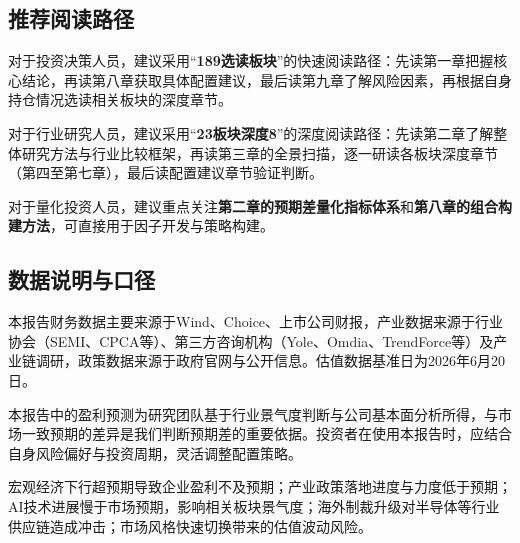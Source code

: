 \subsection{推荐阅读路径}

对于投资决策人员，建议采用“\textbf{189选读板块}”的快速阅读路径：先读第一章把握核心结论，再读第八章获取具体配置建议，最后读第九章了解风险因素，再根据自身持仓情况选读相关板块的深度章节。

对于行业研究人员，建议采用“\textbf{23板块深度8}”的深度阅读路径：先读第二章了解整体研究方法与行业比较框架，再读第三章的全景扫描，逐一研读各板块深度章节（第四至第七章），最后读配置建议章节验证判断。

对于量化投资人员，建议重点关注\textbf{第二章的预期差量化指标体系}和\textbf{第八章的组合构建方法}，可直接用于因子开发与策略构建。

\subsection{数据说明与口径}

本报告财务数据主要来源于Wind、Choice、上市公司财报，产业数据来源于行业协会（SEMI、CPCA等）、第三方咨询机构（Yole、Omdia、TrendForce等）及产业链调研，政策数据来源于政府官网与公开信息。估值数据基准日为2026年6月20日。

本报告中的盈利预测为研究团队基于行业景气度判断与公司基本面分析所得，与市场一致预期的差异是我们判断预期差的重要依据。投资者在使用本报告时，应结合自身风险偏好与投资周期，灵活调整配置策略。

\vspace{0.5em}

\begin{riskbox}[本章风险提示]
宏观经济下行超预期导致企业盈利不及预期；产业政策落地进度与力度低于预期；AI技术进展慢于市场预期，影响相关板块景气度；海外制裁升级对半导体等行业供应链造成冲击；市场风格快速切换带来的估值波动风险。
\end{riskbox}
